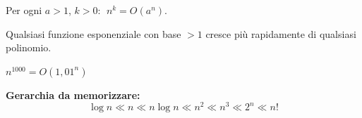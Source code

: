 \begin{teorema}
	Per ogni $a>1$, $k>0$: $\;n^k = O(a^n)$.
	
	Qualsiasi funzione esponenziale con base $>1$ cresce più
	rapidamente di qualsiasi polinomio.
\end{teorema}

\begin{esempio}
	$n^{1000} = O(1{,}01^n)$
\end{esempio}

\begin{hardnote}
	\textbf{Gerarchia da memorizzare:}
	\[
	\log n \ll n \ll n\log n \ll n^2 \ll n^3
	\ll 2^n \ll n!
	\]
\end{hardnote}

